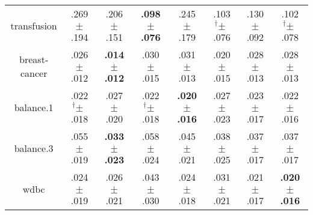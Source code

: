 \begin{tabular}{|c|ccccccc|}
transfusion & .269$^{\phantom{\dag}}\pm^{\phantom{\dag}}$.194\cellcolor{red!40} & .206$^{\phantom{\dag}}\pm^{\phantom{\dag}}$.151\cellcolor{red!10} & \textbf{.098$^{\phantom{\dag}}\pm^{\phantom{\dag}}$.076}\cellcolor{green!40} & .245$^{\phantom{\dag}}\pm^{\phantom{\dag}}$.179\cellcolor{red!28} & .103$^{\dag}\pm^{\phantom{\dag}}$.076\cellcolor{green!37} & .130$^{\phantom{\dag}}\pm^{\phantom{\dag}}$.092\cellcolor{green!24} & .102$^{\dag}\pm^{\phantom{\dag}}$.078\cellcolor{green!38} \\
breast-cancer & .026$^{\phantom{\dag}}\pm^{\phantom{\dag}}$.012\cellcolor{red!16} & \textbf{.014$^{\phantom{\dag}}\pm^{\phantom{\dag}}$.012}\cellcolor{green!40} & .030$^{\phantom{\dag}}\pm^{\phantom{\dag}}$.015\cellcolor{red!35} & .031$^{\phantom{\dag}}\pm^{\phantom{\dag}}$.013\cellcolor{red!40} & .020$^{\phantom{\dag}}\pm^{\phantom{\dag}}$.015\cellcolor{green!8} & .028$^{\phantom{\dag}}\pm^{\phantom{\dag}}$.013\cellcolor{red!28} & .028$^{\phantom{\dag}}\pm^{\phantom{\dag}}$.013\cellcolor{red!26} \\
balance.1 & .022$^{\dag}\pm^{\phantom{\dag}}$.018\cellcolor{green!25} & .027$^{\phantom{\dag}}\pm^{\phantom{\dag}}$.020\cellcolor{red!35} & .022$^{\dag}\pm^{\phantom{\dag}}$.018\cellcolor{green!21} & \textbf{.020$^{\phantom{\dag}}\pm^{\phantom{\dag}}$.016}\cellcolor{green!40} & .027$^{\phantom{\dag}}\pm^{\phantom{\dag}}$.023\cellcolor{red!40} & .023$^{\phantom{\dag}}\pm^{\phantom{\dag}}$.017\cellcolor{green!12} & .022$^{\phantom{\dag}}\pm^{\phantom{\dag}}$.016\cellcolor{green!23} \\
balance.3 & .055$^{\phantom{\dag}}\pm^{\phantom{\dag}}$.019\cellcolor{red!31} & \textbf{.033$^{\phantom{\dag}}\pm^{\phantom{\dag}}$.023}\cellcolor{green!40} & .058$^{\phantom{\dag}}\pm^{\phantom{\dag}}$.024\cellcolor{red!40} & .045$^{\phantom{\dag}}\pm^{\phantom{\dag}}$.021\cellcolor{green!1} & .038$^{\phantom{\dag}}\pm^{\phantom{\dag}}$.025\cellcolor{green!22} & .037$^{\phantom{\dag}}\pm^{\phantom{\dag}}$.017\cellcolor{green!26} & .037$^{\phantom{\dag}}\pm^{\phantom{\dag}}$.017\cellcolor{green!27} \\
wdbc & .024$^{\phantom{\dag}}\pm^{\phantom{\dag}}$.019\cellcolor{green!27} & .026$^{\phantom{\dag}}\pm^{\phantom{\dag}}$.021\cellcolor{green!18} & .043$^{\phantom{\dag}}\pm^{\phantom{\dag}}$.030\cellcolor{red!40} & .024$^{\phantom{\dag}}\pm^{\phantom{\dag}}$.018\cellcolor{green!27} & .031$^{\phantom{\dag}}\pm^{\phantom{\dag}}$.021\cellcolor{green!1} & .021$^{\phantom{\dag}}\pm^{\phantom{\dag}}$.017\cellcolor{green!36} & \textbf{.020$^{\phantom{\dag}}\pm^{\phantom{\dag}}$.016}\cellcolor{green!40} \\

\end{tabular}
